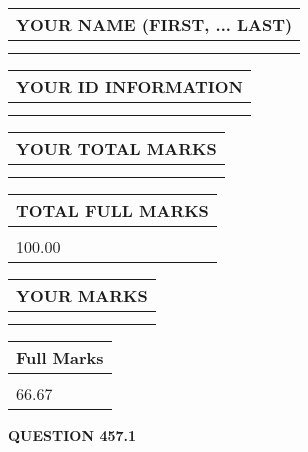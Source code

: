 \documentclass{ctexart}
\begin{document}
   
   
   
\newpage 
\setcounter{page}{ 
   457001 } 
   
   
   
   
\noindent\begin{tabular}{|l|}
\hline
YOUR NAME (FIRST, ... LAST)  \\
\hline
 \\ 
 \\ 
\hline
\end{tabular}
\hspace{0.05in} \begin{tabular}{|l|}
\hline
 YOUR   ID   INFORMATION  \\
\hline
 \\ 
 \\ 
\hline
\end{tabular}
   
   
\vspace{0.2in}\noindent\begin{tabular}{|l|}
\hline
YOUR TOTAL MARKS  \\
\hline
 \\ 
 \\ 
\hline
\end{tabular}
\hspace{0.05in} \begin{tabular}{|l|}
\hline
TOTAL FULL MARKS  \\
\hline
 \\ 
100.00 \\
\hline
\end{tabular}
   
   
 \vspace{0.2in}
 
 
 
 
   
   
  
\vspace{0.2in}
  
\noindent\begin{tabular}{|l|}
\hline
 YOUR MARKS  \\
\hline
 \\ 
 \\ 
\hline
\end{tabular}
\hspace{0.05in} \begin{tabular}{|l|}
\hline
 Full Marks  \\
\hline
 \\ 
66.67 \\
\hline
\end{tabular}
{\textbf{\Large{QUESTION
457.1 
}}}
  
\end{document}

